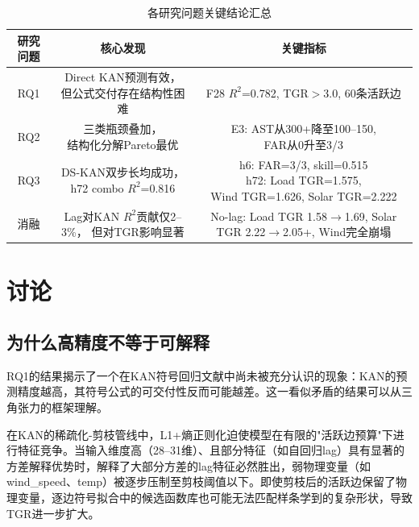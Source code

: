 \documentclass[12pt,a4paper,oneside]{ctexbook}
\newcommand{\FAR}{\text{FAR}}
\newcommand{\TGR}{\text{TGR}}
\begin{document}
\begin{table}[htbp]
\centering
\caption{各研究问题关键结论汇总}
\label{tab:chapter-summary}
\begin{tabular}{ccc}
\toprule
研究问题 & 核心发现 & 关键指标 \\
\midrule
RQ1 & \makecell{Direct KAN预测有效，\\但公式交付存在结构性困难} & \makecell{F28 $R^2$=0.782,\\TGR$>$3.0, 60条活跃边} \\
\addlinespace
RQ2 & \makecell{三类瓶颈叠加，\\结构化分解Pareto最优} & \makecell{E3: AST从300+降至100--150,\\FAR从0升至3/3} \\
\addlinespace
RQ3 & \makecell{DS-KAN双步长均成功，\\h72 combo $R^2$=0.816} & \makecell{h6: FAR=3/3, skill=0.515\\h72: Load TGR=1.575,\\Wind TGR=1.626, Solar TGR=2.222} \\
\addlinespace
消融 & \makecell{Lag对KAN $R^2$贡献仅2--3\%，\\但对TGR影响显著} & \makecell{No-lag: Load TGR 1.58$\to$1.69,\\Solar TGR 2.22$\to$2.05+,\\Wind完全崩塌} \\
\bottomrule
\end{tabular}
\end{table}


\chapter{讨论}

\section{为什么高精度不等于可解释}

RQ1的结果揭示了一个在KAN符号回归文献中尚未被充分认识的现象：KAN的预测精度越高，其符号公式的可交付性反而可能越差。这一看似矛盾的结果可以从三角张力的框架理解。

在KAN的稀疏化-剪枝管线中，L1+熵正则化迫使模型在有限的"活跃边预算"下进行特征竞争。当输入维度高（28--31维）、且部分特征（如自回归lag）具有显著的方差解释优势时，解释了大部分方差的lag特征必然胜出，弱物理变量（如wind\_speed、temp）被逐步压制至剪枝阈值以下。即使剪枝后的活跃边保留了物理变量，逐边符号拟合中的候选函数库也可能无法匹配样条学到的复杂形状，导致TGR进一步扩大。
\end{document}
